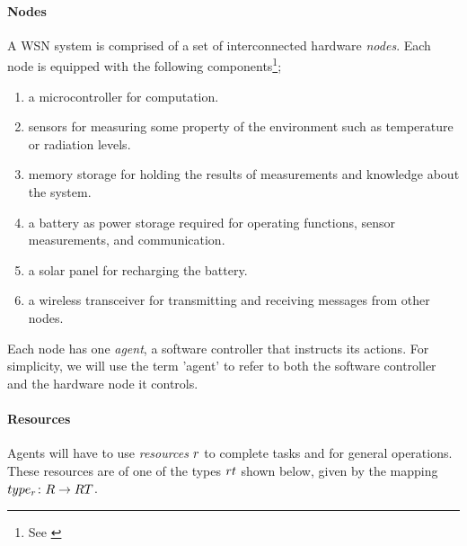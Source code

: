 
\label{problem_overview}

\paragraph{Nodes}
A WSN system is comprised of a set of interconnected hardware \textit{nodes}. Each node is equipped with the following components\footnote{See \cite{muhammad_r_ahmed_2012_1072589}};
\begin{enumerate}
	\item a microcontroller for computation.
	\item sensors for measuring some property of the environment such as temperature or radiation levels.
	\item memory storage for holding the results of measurements and knowledge about the system.
	\item a battery as power storage required for operating functions, sensor measurements, and communication.
	\item a solar panel for recharging the battery.
	\item  a wireless transceiver for  transmitting and receiving messages from other nodes.
\end{enumerate}

Each node has one \textit{agent}, a software controller that instructs its actions. For simplicity, we will use the term 'agent' to refer to both the software controller and the hardware node it controls.

\paragraph{Resources}
\label{section:overview:resources}
\newcommand{\varResourceType}[2]{\varSymbol{RT}{#1}{#2}}
\newcommand{\setResourceType}[2]{\setSymbol{RT}{#1}{#2}}
\newcommand{\formalResourceType}[2]{
	\functionFormal{type_r}
	{\setResource{}{}}
	{\setResourceType{}{}}
}
\newcommand{\functionResourceType}[2]{
	\functionSignature{type_r}
	{\varResource{}{}}}

Agents will have to use \textit{resources} $\varResource{}{}$ to complete tasks and for general operations. These resources are of one of the types $\varResourceType{}{}$ shown below, given by the mapping $\formalResourceType{}{}$.

